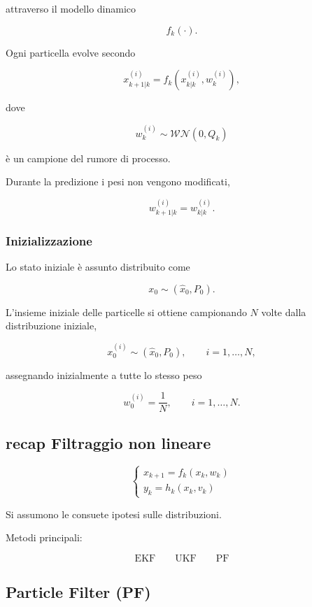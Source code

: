 \documentclass[11pt,a4paper]{article}
\begin{document}
attraverso il modello dinamico

\[
f_k(\cdot).
\]

Ogni particella evolve secondo

\[
\boxed{
x_{k+1|k}^{(i)}
=
f_k
\!\left(
x_{k|k}^{(i)},
w_k^{(i)}
\right),
}
\]

dove

\[
w_k^{(i)}
\sim
\mathcal{WN}(0,Q_k)
\]

è un campione del rumore di processo.

Durante la predizione i pesi non vengono modificati,

\[
\boxed{
w_{k+1|k}^{(i)}
=
w_{k|k}^{(i)}.
}
\]

\subsubsection*{Inizializzazione}

Lo stato iniziale è assunto distribuito come

\[
x_0
\sim
(\hat{x}_0,P_0).
\]

L'insieme iniziale delle particelle si ottiene campionando \(N\) volte dalla distribuzione iniziale,

\[
x_0^{(i)}
\sim
(\hat{x}_0,P_0),
\qquad
i=1,\ldots,N,
\]

assegnando inizialmente a tutte lo stesso peso

\[
\boxed{
w_0^{(i)}
=
\frac{1}{N},
\qquad
i=1,\ldots,N.
}
\]

\subsection{recap Filtraggio non lineare}

\[
\begin{cases}
x_{k+1}=f_k(x_k,w_k)\\
y_k=h_k(x_k,v_k)
\end{cases}
\]

Si assumono le consuete ipotesi sulle distribuzioni.

\vspace{0.5em}

Metodi principali:

\[
\boxed{\text{EKF} \qquad \text{UKF} \qquad \text{PF}}
\]

\subsection{Particle Filter (PF)}
\end{document}
